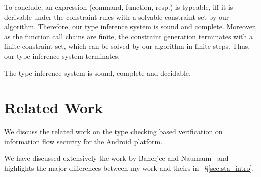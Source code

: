 {{{To conclude, an expression (command, function, resp.) is typeable, iff it is derivable under the constraint rules with a solvable constraint set by our algorithm.
Therefore, our type inference system is sound and complete.
Moreover, as the function call chains are finite, the constraint generation terminates with a finite constraint set, which can be solved by our algorithm in finite steps.
Thus, our type inference system terminates.

\begin{theorem}
The type inference system is sound, complete and decidable.
\end{theorem}


\section{Related Work}

We discuss the related work on the type checking based verification on information flow security for the Android platform.

We have discussed extensively the work by Banerjee and Naumann~\cite{Banerjee:2005ht} and highlights the major differences between my work and theirs in ~\S\ref{sec:sta_intro}.


}}}
